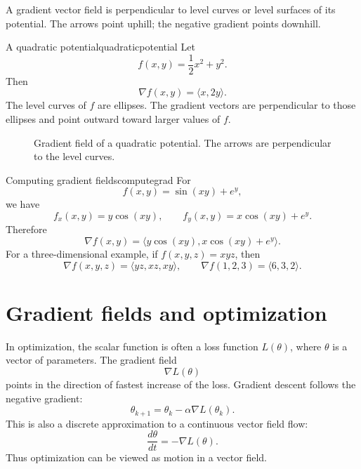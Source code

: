 \documentclass[11pt]{article}
\newcommand{\grad}{\nabla}
\begin{document}
\begin{tipbox}
A gradient vector field is perpendicular to level curves or level surfaces of its potential. The arrows point uphill; the negative gradient points downhill.
\end{tipbox}

\begin{examplebox}{A quadratic potential}{quadraticpotential}
Let
\[
f(x,y)=\frac12 x^2+y^2.
\]
Then
\[
\grad f(x,y)=\langle x,2y\rangle.
\]
The level curves of $f$ are ellipses. The gradient vectors are perpendicular to those ellipses and point outward toward larger values of $f$.
\end{examplebox}

\begin{figure}[H]
\centering
{}
\caption{Gradient field of a quadratic potential. The arrows are perpendicular to the level curves.}
\end{figure}

\begin{examplebox}{Computing gradient fields}{computegrad}
For
\[
f(x,y)=\sin(xy)+e^y,
\]
we have
\[
f_x(x,y)=y\cos(xy),\qquad f_y(x,y)=x\cos(xy)+e^y.
\]
Therefore
\[
\grad f(x,y)=\langle y\cos(xy),x\cos(xy)+e^y\rangle.
\]
For a three-dimensional example, if $f(x,y,z)=xyz$, then
\[
\grad f(x,y,z)=\langle yz,xz,xy\rangle,
\qquad
\grad f(1,2,3)=\langle 6,3,2\rangle.
\]
\end{examplebox}

\section{Gradient fields and optimization}

In optimization, the scalar function is often a loss function $L(\theta)$, where $\theta$ is a vector of parameters. The gradient field
\[
\grad L(\theta)
\]
points in the direction of fastest increase of the loss. Gradient descent follows the negative gradient:
\[
\theta_{k+1}=\theta_k-\alpha\grad L(\theta_k).
\]
This is also a discrete approximation to a continuous vector field flow:
\[
\frac{d\theta}{dt}=-\grad L(\theta).
\]
Thus optimization can be viewed as motion in a vector field.
\end{document}
